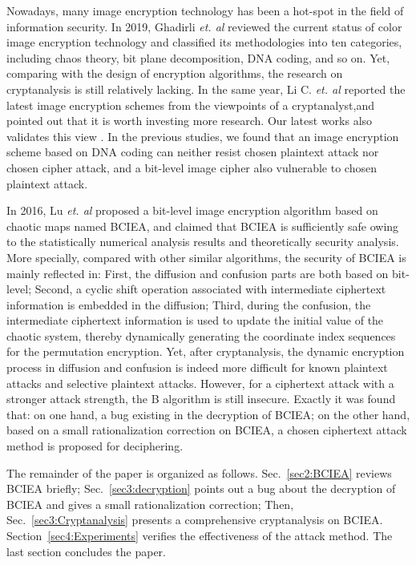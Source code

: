 \documentclass[final,3p,times,twocolumn]{elsarticle}
\begin{document}
Nowadays, many image encryption technology has been a hot-spot in the field of information security. In 2019, Ghadirli \textit{et. al} \cite{Ghadirli2019SP} reviewed the current status of color image encryption technology and classified its methodologies into ten categories, including chaos theory, bit plane decomposition, DNA coding, and so on. Yet, comparing with the design of encryption algorithms, the research on cryptanalysis is still relatively lacking. In the same year, Li C. \textit{et. al} \cite{Ghadirli2019SP,cqli:meet:ISAP19} reported the latest image encryption schemes from the viewpoints of a cryptanalyst,and pointed out that it is worth investing more research.
Our latest works also validates this view \cite{wenhp2019entropy,wenh2019epjp}. In the previous studies, we found that an image encryption scheme \cite{song2015entropy} based on DNA coding can neither resist chosen plaintext attack nor chosen cipher attack, and a bit-level image cipher \cite{Shafique2018epjp} also vulnerable to chosen plaintext attack.

In 2016, Lu \textit{et. al} \cite{LuX2016OLE} proposed a bit-level image encryption algorithm based on chaotic maps named BCIEA, and claimed that BCIEA is sufficiently safe owing to the statistically numerical analysis results and theoretically security analysis. 
More specially, compared with other similar algorithms, the security of BCIEA is mainly reflected in: First, the diffusion and confusion parts are both based on bit-level; Second, a cyclic shift operation associated with intermediate ciphertext information is embedded in the diffusion; Third, during the confusion, the intermediate ciphertext information is used to update the initial value of the chaotic system, thereby dynamically generating the coordinate index sequences for the permutation encryption.
Yet, after cryptanalysis, the dynamic encryption process in diffusion and confusion is indeed more difficult for known plaintext attacks and selective plaintext attacks. However, for a ciphertext attack with a stronger attack strength, the B algorithm is still insecure. Exactly it was found that: on one hand, a bug existing in the decryption of BCIEA; on the other hand, based on a small rationalization correction on BCIEA, a chosen ciphertext attack method is proposed for deciphering. 

The remainder of the paper is organized as follows. Sec.~\ref{sec2:BCIEA} reviews BCIEA briefly;
Sec.~\ref{sec3:decryption} points out a bug about the decryption of BCIEA and gives a small rationalization correction;
Then, Sec.~\ref{sec3:Cryptanalysis} presents a comprehensive cryptanalysis on BCIEA. 
Section~\ref{sec4:Experiments} verifies the effectiveness of the attack method. The last section concludes the paper.
\end{document}
